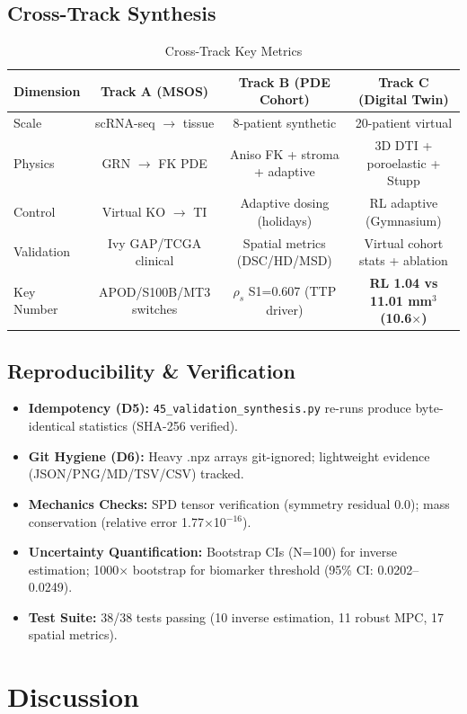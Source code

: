 \documentclass[11pt, twocolumn]{article}
\begin{document}
\subsection{Cross-Track Synthesis}
\begin{table}[h]
\centering
\caption{Cross-Track Key Metrics}
\begin{tabular}{lccc}
\toprule
Dimension & Track A (MSOS) & Track B (PDE Cohort) & Track C (Digital Twin) \\
\midrule
Scale & scRNA-seq $\to$ tissue & 8-patient synthetic & 20-patient virtual \\
Physics & GRN $\to$ FK PDE & Aniso FK + stroma + adaptive & 3D DTI + poroelastic + Stupp \\
Control & Virtual KO $\to$ TI & Adaptive dosing (holidays) & RL adaptive (Gymnasium) \\
Validation & Ivy GAP/TCGA clinical & Spatial metrics (DSC/HD/MSD) & Virtual cohort stats + ablation \\
Key Number & APOD/S100B/MT3 switches & $\rho_s$ S1=0.607 (TTP driver) & \textbf{RL 1.04 vs 11.01 mm$^3$ (10.6$\times$)} \\
\bottomrule
\end{tabular}
\end{table}

\subsection{Reproducibility \& Verification}
\begin{itemize}
\item \textbf{Idempotency (D5):} \texttt{45\_validation\_synthesis.py} re-runs produce byte-identical statistics (SHA-256 verified).
\item \textbf{Git Hygiene (D6):} Heavy .npz arrays git-ignored; lightweight evidence (JSON/PNG/MD/TSV/CSV) tracked.
\item \textbf{Mechanics Checks:} SPD tensor verification (symmetry residual 0.0); mass conservation (relative error 1.77$\times$10$^{-16}$).
\item \textbf{Uncertainty Quantification:} Bootstrap CIs (N=100) for inverse estimation; 1000$\times$ bootstrap for biomarker threshold (95\% CI: 0.0202--0.0249).
\item \textbf{Test Suite:} 38/38 tests passing (10 inverse estimation, 11 robust MPC, 17 spatial metrics).
\end{itemize}

\section{Discussion}
\end{document}
